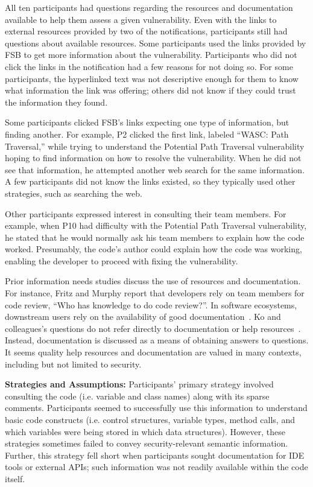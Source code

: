\documentclass[10pt,journal,compsoc]{IEEEtran}
\begin{document}
All ten participants had questions regarding the resources and documentation available to help them assess a given vulnerability. 
Even with the links to external resources provided by two of the notifications, participants still had questions about available resources. 
Some participants used the links provided by FSB to get more information about the vulnerability.
Participants who did not click the links in the notification had a few reasons for not doing so.
For some participants, the hyperlinked text was not descriptive enough for them to know what information the link was offering; others did not know if they could trust the information they found.

Some participants clicked FSB's links expecting one type of information, but finding another. 
For example, P2 clicked the first link, labeled ``WASC: Path Traversal,'' while trying to understand the Potential Path Traversal vulnerability hoping to find information on how to resolve the vulnerability.
When he did not see that information, he attempted another web search for the same information. 
A few participants did not know the links existed, so they typically used other strategies, such as searching the web.

Other participants expressed interest in consulting their team members. 
For example, when P10 had difficulty with the Potential Path Traversal vulnerability, he stated that he would normally ask his team members to explain how the code worked.
Presumably, the code's author could explain how the code was working, enabling the developer to proceed with fixing the vulnerability.

Prior information needs studies discuss the use of resources and documentation.
For instance, Fritz and Murphy report that developers rely on team members for code review, ``Who has knowledge to do code review?''.
In software ecosystems, downstream users rely on the availability of good documentation~\cite{haenni2013categorizing}. 
Ko and colleagues's questions do not refer directly to documentation or help resources~\cite{Ko:2007:information}. 
Instead, documentation is discussed as a means of obtaining answers to questions.
It seems quality help resources and documentation are valued in many contexts, including but not limited to security. 


\textbf{Strategies and Assumptions:}
Participants' primary strategy involved consulting the code (i.e. variable and class names) along with its sparse comments.
Participants seemed to successfully use this information to understand basic code constructs (i.e. control structures, variable types, method calls, and which variables were being stored in which data structures).
However, these strategies sometimes failed to convey security-relevant semantic information.
Further, this strategy fell short when participants sought documentation for IDE tools or external APIs; such information was not readily available within the code itself. 
\end{document}
